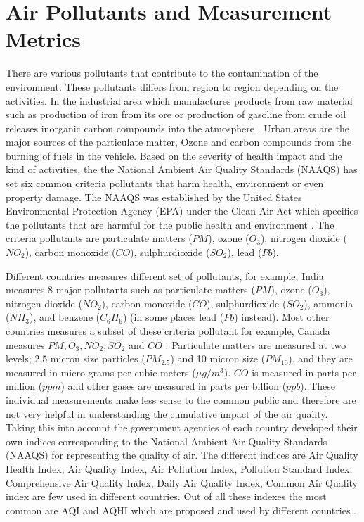 \section{Air Pollutants and Measurement Metrics}


There are various pollutants that contribute to the contamination of the environment. These pollutants differs from region to region depending on the activities. In the industrial area which manufactures products from raw material such as production of iron from its ore or production of gasoline from crude oil releases inorganic carbon compounds into the atmosphere \cite{Vallero2014}. Urban areas are the major sources of the particulate matter, Ozone and carbon compounds from the burning of fuels in the vehicle.
Based on the severity of health impact and the kind of activities, the the National Ambient Air Quality Standards (NAAQS) has set six common criteria pollutants that harm health, environment or even property damage. The NAAQS was established by the United States Environmental Protection Agency (EPA) under the Clean Air Act which specifies the pollutants that are harmful for the public health and environment \cite{USEPA} \cite{NAAQS}. The criteria pollutants are particulate matters ($PM$), ozone ($O_3$),  nitrogen dioxide ($NO_2$), carbon monoxide ($CO$), sulphurdioxide ($SO_2$), lead ($Pb$).

Different countries measures different set of pollutants, for example, India measures 8 major pollutants such as particulate matters ($PM$), ozone ($O_3$),  nitrogen dioxide ($NO_2$), carbon monoxide ($CO$), sulphurdioxide ($SO_2$), ammonia ($NH_3$), and benzene ($C_6H_6$) (in some places lead ($Pb$) instead). Most other countries measures a subset of these criteria pollutant for example, Canada measures $PM, O_3, NO_2, SO_2$ and $CO$ \cite{Chen2013}. Particulate matters are measured at two levels; 2.5 micron size particles ($PM_{2.5}$) and 10 micron size ($PM_{10}$), and they are measured in micro-grams per cubic meters ($\mu g/m^3$). $CO$ is measured in parts per million ($ppm$) and other gases are measured in parts per billion ($ppb$). These individual measurements make less sense to the common public and therefore are not very helpful in understanding the cumulative impact of the air quality. Taking this into account the government agencies of each country developed their own indices corresponding to the National Ambient Air Quality Standards (NAAQS)  for representing the quality of air. The different indices are Air Quality Health Index, Air Quality Index, Air Pollution Index, Pollution Standard Index, Comprehensive Air Quality Index, Daily Air Quality Index, Common Air Quality index are few used in different countries.
Out of all these indexes the most common are AQI and AQHI which are proposed and used by different countries \cite{Chen2013}.

